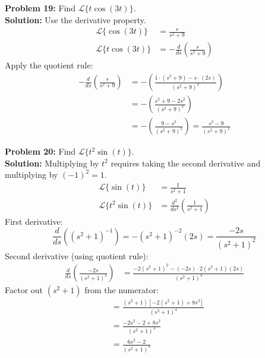 \documentclass[11pt, letterpaper]{article}
\theoremstyle{definition}
\theoremstyle{remark}
\begin{document}
\vspace{1em}
\textbf{Problem 19:} Find $\mathscr{L}\{t\cos(3t)\}$.
\vspace{0.5em} \\
\textbf{Solution:} Use the derivative property.
\begin{align*}
    \mathscr{L}\{\cos(3t)\} &= \frac{s}{s^2 + 9} \\[4pt]
    \mathscr{L}\{t\cos(3t)\} &= -\frac{d}{ds}\left(\frac{s}{s^2 + 9}\right)
\end{align*}
Apply the quotient rule:
\begin{align*}
    -\frac{d}{ds}\left(\frac{s}{s^2 + 9}\right) &= -\left(\frac{1 \cdot (s^2 + 9) - s \cdot (2s)}{(s^2 + 9)^2}\right) \\[4pt]
    &= -\left(\frac{s^2 + 9 - 2s^2}{(s^2 + 9)^2}\right) \\[4pt]
    &= -\left(\frac{9 - s^2}{(s^2 + 9)^2}\right) = \frac{s^2 - 9}{(s^2 + 9)^2}
\end{align*}

\vspace{1em}
\textbf{Problem 20:} Find $\mathscr{L}\{t^2\sin(t)\}$.
\vspace{0.5em} \\
\textbf{Solution:} Multiplying by $t^2$ requires taking the second derivative and multiplying by $(-1)^2 = 1$.
\begin{align*}
    \mathscr{L}\{\sin(t)\} &= \frac{1}{s^2 + 1} \\[4pt]
    \mathscr{L}\{t^2\sin(t)\} &= \frac{d^2}{ds^2}\left(\frac{1}{s^2 + 1}\right)
\end{align*}
First derivative:
\[
\frac{d}{ds}\left((s^2 + 1)^{-1}\right) = -(s^2 + 1)^{-2}(2s) = \frac{-2s}{(s^2 + 1)^2}
\]
Second derivative (using quotient rule):
\begin{align*}
    \frac{d}{ds}\left(\frac{-2s}{(s^2 + 1)^2}\right) &= \frac{-2(s^2 + 1)^2 - (-2s) \cdot 2(s^2 + 1)(2s)}{(s^2 + 1)^4}
\end{align*}
Factor out $(s^2 + 1)$ from the numerator:
\begin{align*}
    &= \frac{(s^2 + 1)[-2(s^2 + 1) + 8s^2]}{(s^2 + 1)^4} \\[4pt]
    &= \frac{-2s^2 - 2 + 8s^2}{(s^2 + 1)^3} \\[4pt]
    &= \frac{6s^2 - 2}{(s^2 + 1)^3}
\end{align*}
\end{document}
